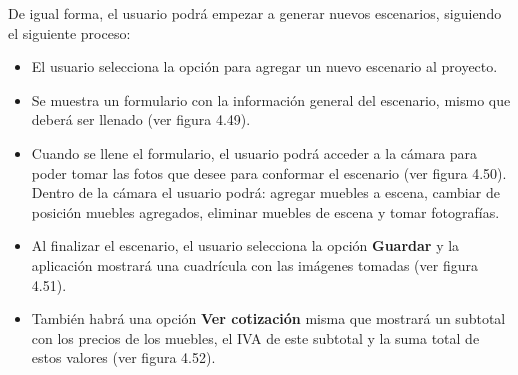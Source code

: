 \clearpage

De igual forma, el usuario podrá empezar a generar nuevos escenarios, siguiendo el siguiente proceso:
\begin{itemize}
	\item El usuario selecciona la opción para agregar un nuevo escenario al proyecto.
	\item Se muestra un formulario con la información general del escenario, mismo que deberá ser llenado (ver figura 4.49).
	\item Cuando se llene el formulario, el usuario podrá acceder a la cámara para poder tomar las fotos que desee para conformar el escenario (ver figura 4.50). Dentro de la cámara el usuario podrá: agregar muebles a escena, cambiar de posición muebles agregados, eliminar muebles de escena y tomar fotografías.
	\item Al finalizar el escenario, el usuario selecciona la opción \textbf{Guardar} y la aplicación mostrará una cuadrícula con las imágenes tomadas (ver figura 4.51).
	\item También habrá una opción \textbf{Ver cotización} misma que mostrará un subtotal con los precios de los muebles, el IVA de este subtotal y la suma total de estos valores (ver figura 4.52).
\end{itemize}



